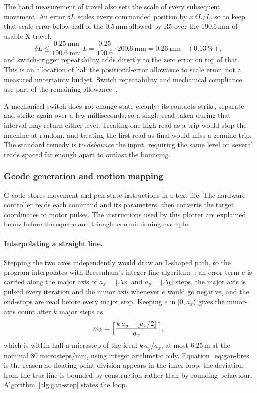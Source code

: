The hand measurement of travel also sets the scale of every subsequent movement. An error $\delta L$ scales every commanded position by $x\,\delta L/L$, so to keep that scale error below half of the 0.5\,mm allowed by R5 over the 190.6\,mm of usable X travel,
\begin{equation}
\delta L\le\frac{0.25\ \mathrm{mm}}{190.6\ \mathrm{mm}}\,L=\frac{0.25}{190.6}\cdot200.6\ \mathrm{mm}=0.26\ \mathrm{mm}\quad(0.13\ \%),
\label{eq:gan-budget}
\end{equation}
and switch-trigger repeatability adds directly to the zero error on top of that. This is an allocation of half the positional-error allowance to scale error, not a measured uncertainty budget. Switch repeatability and mechanical compliance use part of the remaining allowance~\cite[pp.~18--19]{jcgm2008}.

A mechanical switch does not change state cleanly: its contacts strike, separate and strike again over a few milliseconds, so a single read taken during that interval may return either level. Treating one high read as a trip would stop the machine at random, and treating the first read as final would miss a genuine trip. The standard remedy is to \emph{debounce} the input, requiring the same level on several reads spaced far enough apart to outlast the bouncing.
\subsubsection{Gcode generation and motion mapping}
\label{sec:des-drive}
G-code stores movement and pen-state instructions in a text file. The hardware controller reads each command and its parameters, then converts the target coordinates to motor pulses. The instructions used by this plotter are explained below before the square-and-triangle commissioning example.

\paragraph{Interpolating a straight line.}
Stepping the two axes independently would draw an L-shaped path, so the program interpolates with Bresenham's integer line algorithm~\cite[p.~28]{bresenham1965}: an error term $e$ is carried along the major axis of $a_x=|\Delta x|$ and $a_y=|\Delta y|$ steps, the major axis is pulsed every iteration and the minor axis whenever $e$ would go negative, and the end-stops are read before every major step. Keeping $e$ in $[0,a_x)$ gives the minor-axis count after $k$ major steps as
\begin{equation}
m_k=\Bigl\lceil\frac{k\,a_y-\lfloor a_x/2\rfloor}{a_x}\Bigr\rceil,
\label{eq:gan-bres}
\end{equation}
which is within half a microstep of the ideal $k\,a_y/a_x$, at most 6.25\,\textmu m at the nominal 80 microsteps/mm, using integer arithmetic only. Equation~\ref{eq:gan-bres} is the reason no floating-point division appears in the inner loop: the deviation from the true line is bounded by construction rather than by rounding behaviour. Algorithm~\ref{alg:gan-step} states the loop.

